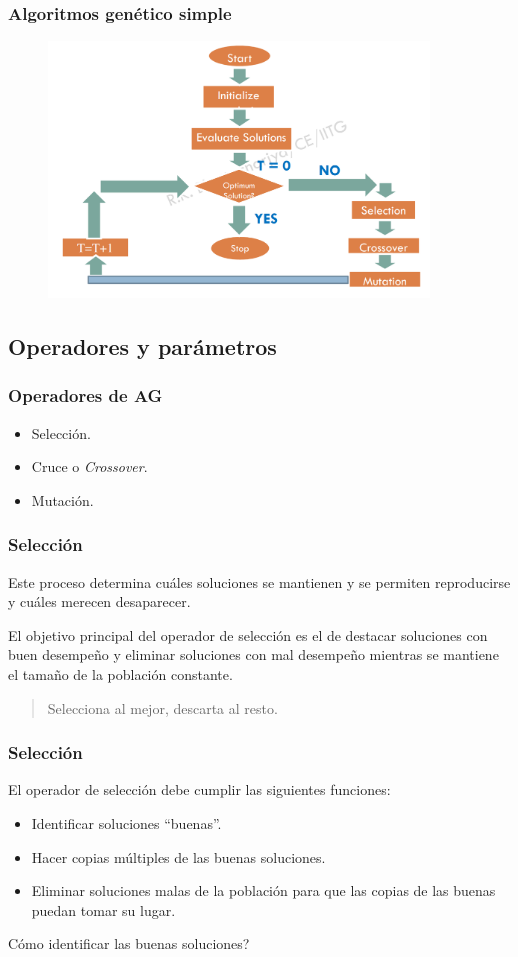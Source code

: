 \documentclass[10pt]{beamer}
\begin{document}
\begin{frame}
  \frametitle{Algoritmos genético simple}
  \begin{figure}[!h] 
    \centering
    \includegraphics[width=0.9\textwidth]{img/gen1}
  \end{figure}
\end{frame}

\subsection{Operadores y parámetros}

\begin{frame}
  \frametitle{Operadores de AG}
  \begin{itemize}
    \item Selección.
    \item Cruce o \textit{Crossover}.
    \item Mutación.
  \end{itemize}
\end{frame}

\begin{frame}
  \frametitle{Selección}
  Este proceso determina cuáles soluciones se mantienen y se permiten
  reproducirse y cuáles merecen desaparecer.

  El objetivo principal del operador de selección es el de destacar soluciones 
  con buen desempeño y eliminar soluciones con mal desempeño mientras se mantiene 
  el tamaño de la población constante.

  \begin{quote}
    Selecciona al mejor, descarta al resto.
  \end{quote}
\end{frame}

\begin{frame}
  \frametitle{Selección}
  El operador de selección debe cumplir las siguientes funciones:
  \begin{itemize}
    \item Identificar soluciones ``buenas''.
    \item Hacer copias múltiples de las buenas soluciones.
    \item Eliminar soluciones malas de la población para 
    que las copias de las buenas puedan tomar su lugar.
  \end{itemize}
  \pause
  Cómo identificar las \alert{buenas soluciones}?
\end{frame}
\end{document}
